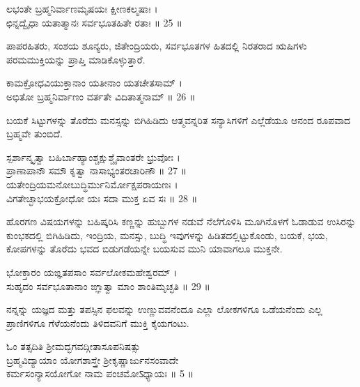 ಲಭಂತೇ ಬ್ರಹ್ಮನಿರ್ವಾಣಮೃಷಯಃ ಕ್ಷೀಣಕಲ್ಮಷಾಃ ।\\
ಛಿನ್ನದ್ವೈಧಾ ಯತಾತ್ಮಾನಃ ಸರ್ವಭೂತಹಿತೇ ರತಾಃ ॥ 25 ॥
\begin{quoting}
ಪಾಪರಹಿತರು, ಸಂಶಯ ಶೂನ್ಯರು, ಜಿತೇಂದ್ರಿಯರು, ಸರ್ವಭೂತಗಳ ಹಿತದಲ್ಲಿ ನಿರತರಾದ ಋಷಿಗಳು ಪರಮಮುಕ್ತಿಯನ್ನು ಪ್ರಾಪ್ತಿ ಮಾಡಿಕೊಳ್ಳುತ್ತಾರೆ.\\
\end{quoting}
ಕಾಮಕ್ರೋಧವಿಯುಕ್ತಾನಾಂ ಯತೀನಾಂ ಯತಚೇತಸಾಮ್ ।\\
ಅಭಿತೋ ಬ್ರಹ್ಮನಿರ್ವಾಣಂ ವರ್ತತೇ ವಿದಿತಾತ್ಮನಾಮ್ ॥ 26 ॥
\begin{quoting}
ಬಯಕೆ ಸಿಟ್ಟುಗಳನ್ನು ತೊರೆದು ಮನಸ್ಸನ್ನು ಬಿಗಿಹಿಡಿದು ಆತ್ಮವನ್ನರಿತ ಸನ್ಯಾಸಿಗಳಿಗೆ ಎಲ್ಲೆಡೆಯೂ ಆನಂದ ರೂಪವಾದ ಬ್ರಹ್ಮವೇ ತುಂಬಿದೆ.\\
\end{quoting}
ಸ್ಪರ್ಶಾನ್ಕೃತ್ವಾ ಬಹಿರ್ಬಾಹ್ಯಾಂಶ್ಚಕ್ಷುಶ್ಚೈವಾಂತರೇ ಭ್ರುವೋಃ ।\\
ಪ್ರಾಣಾಪಾನೌ ಸಮೌ ಕೃತ್ವಾ ನಾಸಾಭ್ಯಂತರಚಾರಿಣೌ ॥ 27 ॥\\
ಯತೇಂದ್ರಿಯಮನೋಬುದ್ಧಿರ್ಮುನಿರ್ಮೋಕ್ಷಪರಾಯಣಃ ।\\
ವಿಗತೇಚ್ಛಾಭಯಕ್ರೋಧೋ ಯಃ ಸದಾ ಮುಕ್ತ ಏವ ಸಃ ॥ 28 ॥
\begin{quoting}
ಹೊರಗಣ ವಿಷಯಗಳನ್ನು ಬಹಿಷ್ಕರಿಸಿ ಕಣ್ಣನ್ನು ಹುಬ್ಬುಗಳ ನಡುವೆ ನೆಲೆಗೊಳಿಸಿ ಮೂಗಿನೊಳಗೆ ಓಡಾಡುವ ಉಸಿರನ್ನು ಕುಂಭಕದಲ್ಲಿ ಬಿಗಿಹಿಡಿದು, ಇಂದ್ರಿಯ, ಮನಸ್ಸು, ಬುದ್ಧಿ ಇವುಗಳನ್ನು ಹಿಡಿತದಲ್ಲಿಟ್ಟುಕೊಂಡು, ಬಯಕೆ, ಭಯ, ಕೋಪಗಳನ್ನು ತೊರೆದು ಭವದ ಬಿಡುಗಡೆಯನ್ನೇ ಬಯಸುವ ಮುನಿ ಯಾವಾಗಲೂ ಮುಕ್ತನೇ.\\
\end{quoting}
ಭೋಕ್ತಾರಂ ಯಙ್ಞತಪಸಾಂ ಸರ್ವಲೋಕಮಹೇಶ್ವರಮ್ ।\\
ಸುಹೃದಂ ಸರ್ವಭೂತಾನಾಂ ಙ್ಞಾತ್ವಾ ಮಾಂ ಶಾಂತಿಮೃಚ್ಛತಿ ॥ 29 ॥
\begin{quoting}
ನನ್ನನ್ನು ಯಜ್ಞದ ಮತ್ತು ತಪಸ್ಸಿನ ಫಲವನ್ನು ಉಣ್ಣುವವನೆಂದೂ ಎಲ್ಲಾ ಲೋಕಗಳಿಗೂ ಒಡೆಯನೆಂದು ಎಲ್ಲ ಪ್ರಾಣಿಗಳಿಗೂ ಗೆಳೆಯನೆಂದು ತಿಳಿದವನಿಗೆ ಮುಕ್ತಿ ಕೈಯಗಂಟು.\\
\end{quoting}
\begin{center}
{\tiny\color{brown}
ಓಂ ತತ್ಸದಿತಿ ಶ್ರೀಮದ್ಭಗವದ್ಗೀತಾಸೂಪನಿಷತ್ಸು\\
ಬ್ರಹ್ಮವಿದ್ಯಾಯಾಂ ಯೋಗಶಾಸ್ತ್ರೇ ಶ್ರೀಕೃಷ್ಣಾರ್ಜುನಸಂವಾದೇ\\
ಕರ್ಮಸಂನ್ಯಾಸಯೋಗೋ ನಾಮ ಪಂಚಮೋऽಧ್ಯಾಯಃ ॥ 5 ॥\\}
\end{center}
